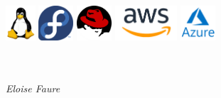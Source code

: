 \documentclass[]{friggeri-cv}
\begin{document}
\includegraphics[height=13mm]{logo/linux-logo.png} \qquad \qquad
\includegraphics[height=13mm]{logo/fedora-logo.png} \qquad \qquad
\includegraphics[height=13mm]{logo/redhat-logo.png} \qquad
\includegraphics[height=13mm]{logo/aws-logo.png}\qquad 
\includegraphics[height=13mm]{logo/azure-logo.png} \qquad
\\ 
\\ 
\\ 
\begin{flushright}
\emph{Eloise Faure}
\end{flushright}
\end{document}
